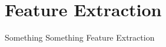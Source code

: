 
\chapter{Feature Extraction}
\label{chp:FeatureExtractionChapter}

Something Something Feature Extraction